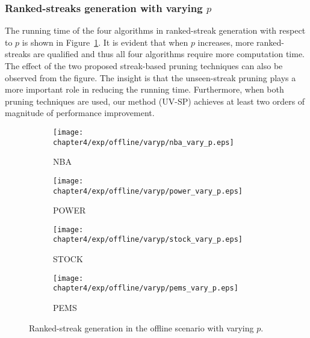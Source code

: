 \subsubsection{Ranked-streaks generation with varying $p$}
The running time of the four algorithms in ranked-streak generation with respect to $p$ is shown in Figure~\ref{exp:offline_performance_vary_p}. It is evident that when $p$ increases, more ranked-streaks are qualified and thus all four algorithms require more computation time. The effect of the two proposed streak-based pruning techniques can also be observed from the figure. The insight is that the unseen-streak pruning plays a more important role in reducing the running time. Furthermore, when both pruning techniques are used, our method (UV-SP) achieves at least two orders of magnitude of performance improvement.

\begin{figure}[t]
\centering
    \begin{subfigure}[b]{0.45\textwidth}
        \texttt{[image: chapter4/exp/offline/varyp/nba\_vary\_p.eps]}
        \caption{NBA}
    \end{subfigure}
    \begin{subfigure}[b]{0.45\textwidth}
        \texttt{[image: chapter4/exp/offline/varyp/power\_vary\_p.eps]}
        \caption{POWER}
    \end{subfigure}
    \begin{subfigure}[b]{0.45\textwidth}
        \texttt{[image: chapter4/exp/offline/varyp/stock\_vary\_p.eps]}
        \caption{STOCK}
    \end{subfigure}
    \begin{subfigure}[b]{0.45\textwidth}
        \texttt{[image: chapter4/exp/offline/varyp/pems\_vary\_p.eps]}
        \caption{PEMS}
    \end{subfigure}
\caption{Ranked-streak generation in the offline scenario with varying $p$.}
\label{exp:offline_performance_vary_p}
\end{figure}

